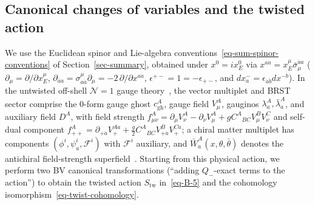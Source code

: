 \documentclass[11pt]{article}
\numberwithin{equation}{section}
\numberwithin{figure}{section}
\numberwithin{table}{section}
\begin{document}
\subsection{Canonical changes of variables and the twisted action}\label{canonical-changes-of-variables}

We use the Euclidean spinor and Lie-algebra conventions~\eqref{eq-sum-spinor-conventions} of Section~\ref{sec-summary}, obtained under $x^0=ix_E^0$ via $x^{a\dot a}=x_E^\mu\bar\sigma_\mu^{\dot a a}$ ($\partial_\mu=\partial/\partial x_E^\mu$, $\partial_{a\dot a}=\sigma^\mu_{a\dot a}\partial_\mu=-2\,\partial/\partial x^{a\dot a}$, $\epsilon^{+-}=1=-\epsilon_{+-}$, and $dx^-_{\dot a}=\epsilon_{\dot a\dot b}dx^{-\dot b}$). In the untwisted off-shell $\mathcal N=1$ gauge theory~\cite[Chapters 26--27]{Weinberg}, the vector multiplet and BRST sector comprise the 0-form gauge ghost $c_{\mathrm{gh}}^A$, gauge field $V_\mu^A$, gauginos $\lambda_a^A,\bar\lambda_{\dot a}^A$, and auxiliary field $D^A$, with field strength $f_{\mu\nu}^A=\partial_\mu V_\nu^A-\partial_\nu V_\mu^A+gC^A{}_{BC}V_\mu^BV_\nu^C$ and self-dual component $f_{++}^A=\partial_{+\dot a}V_+^{A\dot a}+\tfrac g2C^A{}_{BC}V_{+\dot a}^BV_+^{C\dot a}$; a chiral matter multiplet has components $(\phi^i,\psi_a^i,\mathcal F^i)$ with $\mathcal F^i$ auxiliary, and $\bar W_{\dot a}^A(x,\theta,\bar\theta)$ denotes the antichiral field-strength superfield~\cite[Eqs.~(27.2.12), (27.3.16)]{Weinberg}. Starting from this physical action, we perform two BV canonical transformations (``adding $Q_-$-exact terms to the action'') to obtain the twisted action $S_{\mathrm{tw}}$ in~\eqref{eq-B-5} and the cohomology isomorphism~\eqref{eq-twist-cohomology}.
\end{document}
